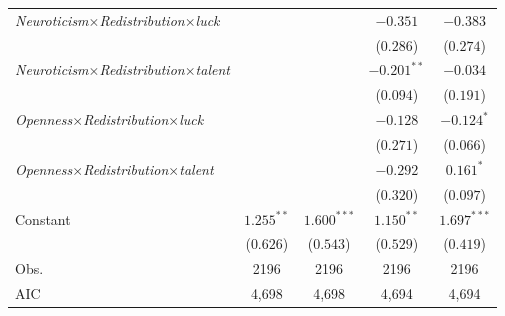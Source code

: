 \begin{footnotesize}
\begin{longtable}{l cc cc}
\textit{Neuroticism}$\times$\textit{Redistribution}$\times$\textit{luck} &  &  & $-0.351$ & $-0.383$ \\
    &  &  & ($0.286$) & ($0.274$) \\
\textit{Neuroticism}$\times$\textit{Redistribution}$\times$\textit{talent} &  &  & $-0.201^{**}$ & $-0.034$ \\
    &  &  & ($0.094$) & ($0.191$) \\
\textit{Openness}$\times$\textit{Redistribution}$\times$\textit{luck} &  &  & $-0.128$ & $-0.124^{*}$ \\
    &  &  & ($0.271$) & ($0.066$) \\
\textit{Openness}$\times$\textit{Redistribution}$\times$\textit{talent} &  &  & $-0.292$ & $0.161^{*}$ \\
    &  &  & ($0.320$) & ($0.097$) \\
Constant & $1.255^{**}$ & $1.600^{***}$ & $1.150^{**}$ & $1.697^{***}$ \\
    & ($0.626$) & ($0.543$) & ($0.529$) & ($0.419$) \\
\midrule
Obs. & 2196 & 2196 & 2196 & 2196 \\
AIC  & 4,698 & 4,698 & 4,694 & 4,694 \\
\end{longtable}
\end{footnotesize}

